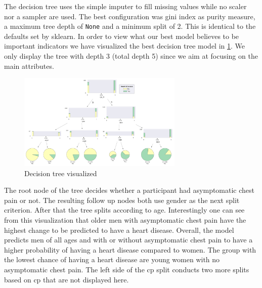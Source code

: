 The decision tree uses the simple imputer to fill missing values while no scaler nor a sampler are used. The best configuration was gini index as purity measure, a maximum tree depth of \texttt{None} and a minimum split of 2. This is identical to the defaults set by sklearn. 
In order to view what our best model believes to be important indicators we have visualized the best decision tree model in \cref{fig:DecisionTree}. We only display the tree with depth 3 (total depth 5) since we aim at focusing on the main attributes. 
\begin{figure}[h]
	\centering
	\includegraphics[width=0.7\textwidth]{images/DecisionTree.png}
	\caption{Decision tree visualized}
	\label{fig:DecisionTree}
\end{figure}

The root node of the tree decides whether a participant had asymptomatic chest pain or not. The resulting follow up nodes both use gender as the next split criterion. After that the tree splits according to age. Interestingly one can see from this visualization that older men with asymptomatic chest pain have the highest change to be predicted to have a heart disease. Overall, the model predicts men of all ages and with or without asymptomatic chest pain to have a higher probability of having a heart disease compared to women. The group with the lowest chance of having a heart disease are young women with no asymptomatic chest pain. The left side of the cp split conducts two more splits based on cp that are not displayed here. 